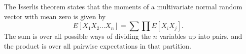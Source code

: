 The Isserlis theorem states that the moments of a multivariate normal random
vector with mean zero is given by
\begin{equation}
  E[X_1X_2 \ldots X_n] = \sum \prod E[X_iX_j].
\end{equation}
The sum is over all possible ways of dividing the $n$ variables up into pairs,
and the product is over all pairwise expectations in that partition.
